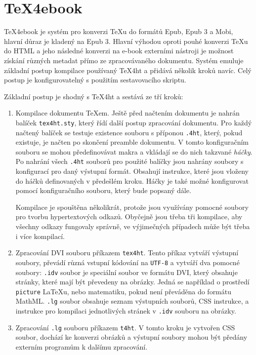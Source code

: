 \documentclass{csbulletin}
\begin{document}
\section{TeX4ebook}

TeX4ebook je systém pro konverzi \TeX u do formátů Epub, Epub 3 a Mobi, hlavní
důraz je kladený na Epub 3. Hlavní výhodou oproti pouhé konverzi \TeX u do HTML
a jeho následné konverzi na e-book externími nástroji je možnost získání
různých metadat přímo ze zpracovávaného dokumentu. Systém emuluje základní
postup kompilace používaný TeX4ht a přidává několik kroků navíc. Celý postup je
konfigurovatelný s použitím sestavovacího skriptu.

Základní postup je shodný s TeX4ht a sestává ze tří kroků:

\begin{enumerate}
  \item Kompilace dokumentu \TeX em. Ještě před načtením dokumentu je nahrán
    balíček \texttt{tex4ht.sty}, který řídí další postup zpracování dokumentu.
    Pro každý načtený balíček se testuje existence souboru s příponou
    \texttt{.4ht}, který, pokud existuje, je načten po skončení preamble
    dokumentu. V tomto konfiguračním souboru se mohou předefinovávat makra a
    vkládají se do nich takzvané \textit{háčky}. Po nahrání všech \texttt{.4ht}
    souborů pro použité balíčky jsou nahrány soubory s konfigurací pro daný
    výstupní formát. Obsahují instrukce, které jsou vloženy do háčků
    definovaných v předešlém kroku. Háčky je také možné konfigurovat pomocí
    konfiguračního souboru, který bude popsaný dále. 

    Kompilace je spouštěna několikrát, protože jsou využívány pomocné soubory
    pro tvorbu hypertextových odkazů. Obyčejně jsou třeba tři kompilace, aby
    všechny odkazy fungovaly správně, ve výjimečných případech může být třeba i
    více kompilací. 

  \item Zpracování DVI souboru příkazem \texttt{tex4ht}. Tento příkaz vytváří
    výstupní soubory, převádí různá vstupní kódování na \texttt{UTF-8} a
    vytváří dva pomocné soubory: \texttt{.idv} soubor je speciální soubor ve
    formátu DVI, který obsahuje stránky, které mají být převedeny na obrázky.
    Jedná se například o prostředí \texttt{picture} LaTeXu, nebo matematiku,
    pokud není převáděna do formátu MathML. \texttt{.lg} soubor obsahuje seznam
    výstupních souborů, CSS instrukce, a instrukce pro kompilaci jednotlivých
    stránek v \texttt{.idv} souboru na obrázky.
  \item Zpracování \texttt{.lg} souboru příkazem \texttt{t4ht}. V tomto kroku
    je vytvořen CSS soubor, dochází ke konverzi obrázků a výstupní soubory
    mohou být předány externím programům k dalšímu zpracování.
\end{enumerate} 
\end{document}
